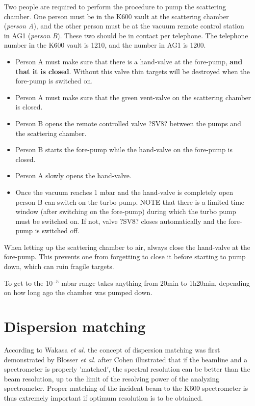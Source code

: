 \documentclass[11pt]{report}
\begin{document}
Two people are required to perform the procedure to pump the scattering chamber.
One person must be in the K600 vault at the scattering chamber ({\it person A}), 
 and the other person must be at the vacuum remote control station in AG1 ({\it person B}). These two should be in contact per telephone. The telephone number in the K600 vault is 1210, and the number in AG1 is 1200. 

\begin{itemize}
\item Person A must make sure that there is a hand-valve at the fore-pump, {\bf and that it is closed}. Without this valve thin targets will be destroyed when the fore-pump is switched on.
\item Person A must make sure that the green vent-valve on the scattering chamber is closed.
\item Person B opens the remote controlled valve ?SV8? between the pumps and the scattering chamber.
\item Person B starts the fore-pump while the hand-valve on the fore-pump is closed.
\item Person A slowly opens the hand-valve. 
\item Once the vacuum reaches 1 mbar and the hand-valve is completely open person B can switch on the turbo pump. NOTE that there is a limited time window (after switching on the fore-pump) during which the turbo pump must be switched on. If not, valve ?SV8? closes automatically and the fore-pump is switched off.  
\end{itemize}

\noindent When letting up the scattering chamber to air, always close the hand-valve at the fore-pump. 
This prevents one from forgetting to close it before starting to pump down,
which can ruin fragile targets.

To get to the 10$^{-5}$ mbar range takes anything from 20min to 1h20min,
depending on how long ago the chamber was pumped down.



\clearpage

\chapter{Dispersion matching}\label{chap:Dispersion-Matching}


According to Wakasa {\it et al.} \cite{Wak02}
the concept of dispersion matching was first demonstrated by Blosser {\it et al.}
\cite{Blo71} after Cohen \cite{Coh59} illustrated that if the beamline and a spectrometer 
is properly 'matched', the spectral resolution can be better than 
the beam resolution, up to the limit of the resolving power of the analyzing 
spectrometer.
Proper matching of the incident beam to the K600 spectrometer is thus extremely
important if optimum resolution is to be obtained. 
\end{document}
